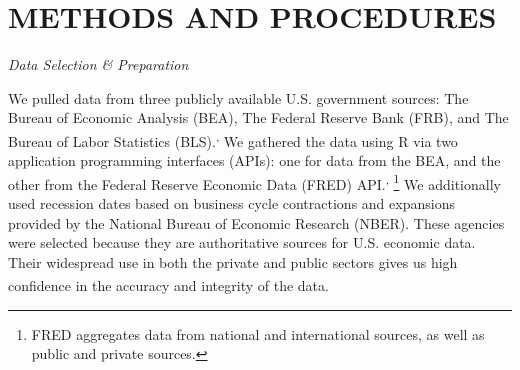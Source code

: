\documentclass[10pt, letterpaper]{article}
\begin{document}
\section{METHODS AND PROCEDURES}\label{methods-and-procedures}

\emph{Data Selection \& Preparation}

We pulled data from three publicly available U.S. government sources:
The Bureau of Economic Analysis (BEA), The Federal Reserve Bank (FRB),
and The Bureau of Labor Statistics
(BLS).\textsuperscript{,
} We gathered the data using R via
two application programming interfaces (APIs): one for data from the
BEA, and the other from the Federal Reserve Economic Data (FRED)
API.\textsuperscript{,
}\footnote{FRED aggregates data from national and international sources, as well as public and private sources.}
We additionally used recession dates based on business cycle
contractions and expansions provided by the National Bureau of Economic
Research (NBER). These agencies were selected because they are
authoritative sources for U.S. economic data. Their widespread use in
both the private and public sectors gives us high confidence in the
accuracy and integrity of the
data.\textsuperscript{}
\end{document}
